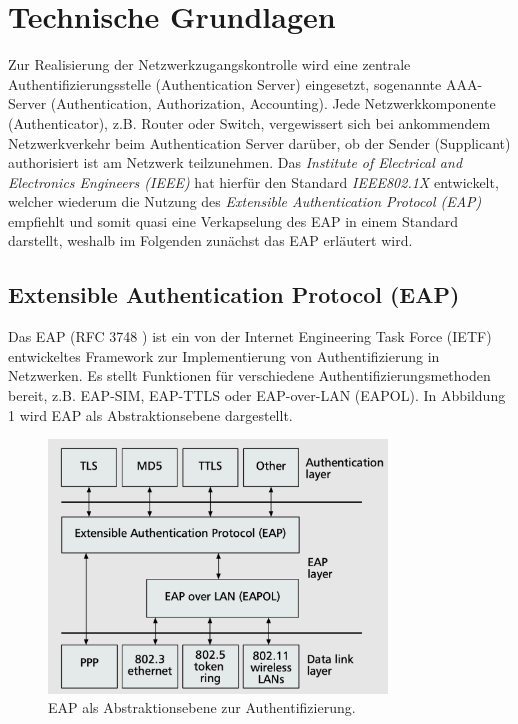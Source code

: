 \documentclass[conference]{IEEEtran}
\begin{document}
\section{Technische Grundlagen}
Zur Realisierung der Netzwerkzugangskontrolle wird eine zentrale Authentifizierungsstelle (Authentication Server) eingesetzt, sogenannte AAA-Server (Authentication, Authorization, Accounting). Jede Netzwerkkomponente (Authenticator), z.B. Router oder Switch, vergewissert sich bei ankommendem Netzwerkverkehr beim Authentication Server darüber, ob der Sender (Supplicant) authorisiert ist am Netzwerk teilzunehmen. Das \emph{Institute of Electrical and Electronics Engineers (IEEE)} hat hierfür den Standard \emph{IEEE802.1X} entwickelt, welcher wiederum die Nutzung des \emph{Extensible Authentication Protocol (EAP)} empfiehlt und somit quasi eine Verkapselung des EAP in einem Standard darstellt, weshalb im Folgenden zunächst das EAP erläutert wird.

\subsection{Extensible Authentication Protocol (EAP)}
Das EAP (RFC 3748 \cite{aboba2004extensible}) ist ein von der Internet Engineering Task Force (IETF) entwickeltes Framework zur Implementierung von Authentifizierung in Netzwerken. Es stellt Funktionen für verschiedene Authentifizierungsmethoden bereit, z.B. EAP-SIM, EAP-TTLS oder EAP-over-LAN (EAPOL). \cite{1561920} In Abbildung 1 wird EAP als Abstraktionsebene dargestellt.\\

\begin{figure}[hbt]
	\centering
	\includegraphics[width=9cm]{figures/EAP}
	\caption{EAP als Abstraktionsebene zur Authentifizierung. \cite{1561920}}
\end{figure}
\end{document}
